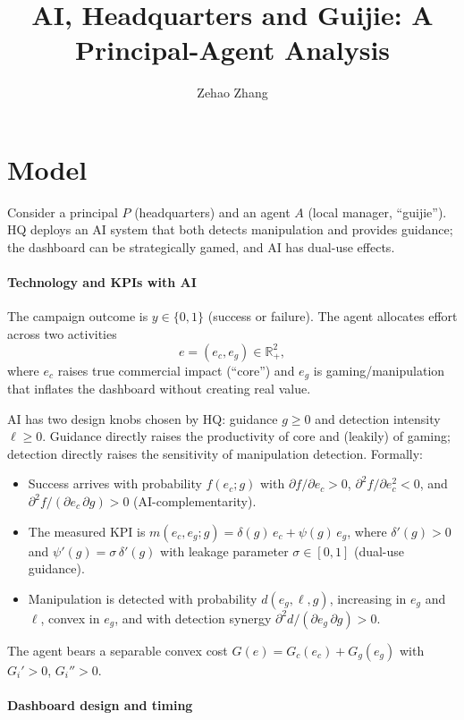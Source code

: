\documentclass[11pt]{article}
\title{AI, Headquarters and Guijie: A Principal-Agent Analysis}
\author{Zehao Zhang}
\begin{document}
\maketitle

\section{Model}
\label{sec:model}

Consider a principal $P$ (headquarters) and an agent $A$ (local manager, ``guijie''). HQ deploys an AI system that both detects manipulation and provides guidance; the dashboard can be strategically gamed, and AI has dual-use effects.

\paragraph{Technology and KPIs with AI}

The campaign outcome is $y \in \{0,1\}$ (success or failure). The agent allocates effort across two activities
\[
e = (e_c, e_g) \in \mathbb{R}_+^2,
\]
where $e_c$ raises true commercial impact (``core'') and $e_g$ is gaming/manipulation that inflates the dashboard without creating real value.

AI has two design knobs chosen by HQ: guidance $g \ge 0$ and detection intensity $\ell \ge 0$. Guidance directly raises the productivity of core and (leakily) of gaming; detection directly raises the sensitivity of manipulation detection. Formally:
\begin{itemize}
  \item Success arrives with probability $f(e_c; g)$ with $\partial f/\partial e_c>0$, $\partial^2 f/\partial e_c^2<0$, and $\partial^2 f/(\partial e_c \, \partial g) > 0$ (AI-complementarity).
  \item The measured KPI is $m(e_c,e_g; g) = \delta(g)\, e_c + \psi(g)\, e_g$, where $\delta'(g) > 0$ and $\psi'(g) = \sigma\, \delta'(g)$ with leakage parameter $\sigma \in [0,1]$ (dual-use guidance).
  \item Manipulation is detected with probability $d(e_g,\ell,g)$, increasing in $e_g$ and $\ell$, convex in $e_g$, and with detection synergy $\partial^2 d/(\partial e_g \, \partial g) > 0$.
\end{itemize}

The agent bears a separable convex cost $G(e) = G_c(e_c)+G_g(e_g)$ with $G_i' > 0$, $G_i'' > 0$.

\paragraph{Dashboard design and timing}
\end{document}
